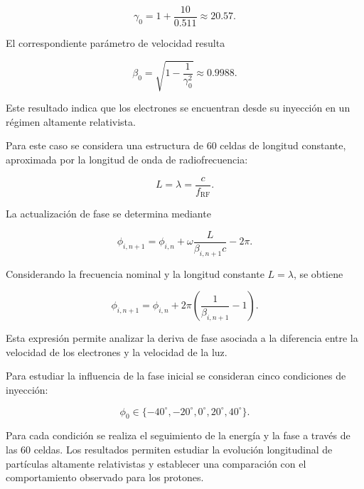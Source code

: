 \begin{equation}
    \gamma_0
    =
    1+\frac{10}{0.511}
    \approx20.57.
\end{equation}

El correspondiente parámetro de velocidad resulta

\begin{equation}
    \beta_0
    =
    \sqrt{1-\frac{1}{\gamma_0^2}}
    \approx0.9988.
\end{equation}

Este resultado indica que los electrones se encuentran desde su inyección en un régimen altamente relativista.

Para este caso se considera una estructura de 60 celdas de longitud constante, aproximada por la longitud de onda de radiofrecuencia:

\begin{equation}
    L=\lambda=\frac{c}{f_{\mathrm{RF}}}.
\end{equation}

La actualización de fase se determina mediante

\begin{equation}
    \phi_{i,n+1}
    =
    \phi_{i,n}
    +
    \omega\frac{L}{\beta_{i,n+1}c}
    -
    2\pi.
\end{equation}

Considerando la frecuencia nominal y la longitud constante $L=\lambda$, se obtiene

\begin{equation}
    \boxed{
    \phi_{i,n+1}
    =
    \phi_{i,n}
    +
    2\pi
    \left(
    \frac{1}{\beta_{i,n+1}}-1
    \right)
    }.
\end{equation}

Esta expresión permite analizar la deriva de fase asociada a la diferencia entre la velocidad de los electrones y la velocidad de la luz.

Para estudiar la influencia de la fase inicial se consideran cinco condiciones de inyección:

\begin{equation}
    \phi_0\in
    \{-40^\circ,-20^\circ,0^\circ,20^\circ,40^\circ\}.
\end{equation}

Para cada condición se realiza el seguimiento de la energía y la fase a través de las 60 celdas. Los resultados permiten estudiar la evolución longitudinal de partículas altamente relativistas y establecer una comparación con el comportamiento observado para los protones.